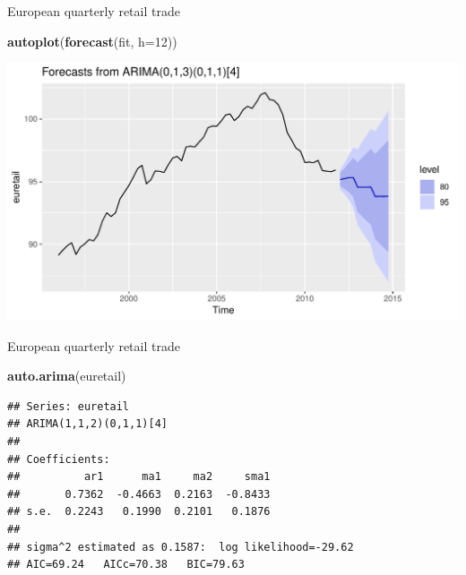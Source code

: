 \documentclass[14pt,ignorenonframetext,]{beamer}
\newenvironment{Shaded}{\begin{snugshade}}{\end{snugshade}}
\newcommand{\KeywordTok}[1]{\textcolor[rgb]{0.13,0.29,0.53}{\textbf{#1}}}
\newcommand{\DataTypeTok}[1]{\textcolor[rgb]{0.13,0.29,0.53}{#1}}
\newcommand{\DecValTok}[1]{\textcolor[rgb]{0.00,0.00,0.81}{#1}}
\newcommand{\NormalTok}[1]{#1}
\begin{document}
\begin{frame}[fragile]{European quarterly retail trade}

\begin{Shaded}
\begin{Highlighting}[]
\KeywordTok{autoplot}\NormalTok{(}\KeywordTok{forecast}\NormalTok{(fit, }\DataTypeTok{h=}\DecValTok{12}\NormalTok{))}
\end{Highlighting}
\end{Shaded}

\includegraphics{week_5_arima_files/figure-beamer/unnamed-chunk-51-1.pdf}

\end{frame}

\begin{frame}[fragile]{European quarterly retail trade}

\fontsize{12}{14}\sf

\begin{Shaded}
\begin{Highlighting}[]
\KeywordTok{auto.arima}\NormalTok{(euretail)}
\end{Highlighting}
\end{Shaded}

\begin{verbatim}
## Series: euretail 
## ARIMA(1,1,2)(0,1,1)[4] 
## 
## Coefficients:
##          ar1      ma1     ma2     sma1
##       0.7362  -0.4663  0.2163  -0.8433
## s.e.  0.2243   0.1990  0.2101   0.1876
## 
## sigma^2 estimated as 0.1587:  log likelihood=-29.62
## AIC=69.24   AICc=70.38   BIC=79.63
\end{verbatim}

\end{frame}
\end{document}
